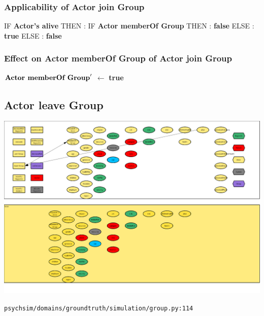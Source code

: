\documentclass{article}%
\begin{document}
\subsubsection{Applicability of Actor join Group}%
\label{ssubsec:Applicability of Actor join Group}%
\begin{flushleft}%
IF %
\textbf{Actor's alive}%
\linebreak%
\hspace*{2em}%
THEN %
: %
IF %
\textbf{Actor memberOf Group}%
\linebreak%
\hspace*{4em}%
THEN %
: %
\textbf{false}%
\linebreak%
\hspace*{4em}%
ELSE %
: %
\textbf{true}%
\linebreak%
\hspace*{2em}%
ELSE %
: %
\textbf{false}%
\end{flushleft}

%
\subsubsection{Effect on Actor memberOf Group of Actor join Group}%
\label{ssubsec:Effect on Actor memberOf Group of Actor join Group}%
\begin{flushleft}%
$\mbox{\textbf{Actor memberOf Group}} '$%
$\leftarrow$%
\textbf{true}%
\end{flushleft}

%
\subsection{Actor leave Group}%
\label{subsec:Actor leave Group}%
\includegraphics[width=\textwidth]{images/Actor-leave-Group.png}%
\begin{flushleft}%
\verb|psychsim/domains/groundtruth/simulation/group.py:114|%
\end{flushleft}%
\end{document}

